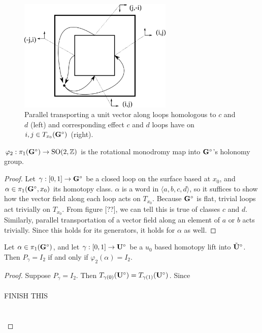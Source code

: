 \documentclass[a4paper, 11pt]{article}
\def\btUs{\btU^\circ}
\def\<{\langle} \def\>{\rangle}
\begin{document}
\begin{figure}[H]
\centering

\includegraphics[width=2.9in]{monodromy.png}
\caption{Parallel transporting a unit vector along loops homologous to $c$ and $d$ (left) and corresponding effect $c$ and $d$ loops have on $i,j\in T_{x_0}(\mathbf{G}^\circ)$ (right).}
\label{fig:loop}
\end{figure}

\begin{thm}
$\varphi_2:\pi_1(\mathbf{G}^\circ)\rightarrow \mathrm{SO}(2,\mathbb{Z})$ is the rotational monodromy map into $\mathbf{G}^\circ$'s holonomy group.
\begin{proof}
Let $\gamma:[0,1]\rightarrow\mathbf{G}^\circ$ be a closed loop on the surface based at $x_0$, and $\alpha\in\pi_1(\mathbf{G}^\circ,x_0)$ its homotopy class. $\alpha$ is a word in $\<a,b,c,d\>$, so it suffices to show how the vector field along each loop acts on $T_{x_0}$. Because $\mathbf{G}^\circ$ is flat, trivial loops act trivially on $T_{x_0}$. From figure [??], we can tell this is true of classes $c$ and $d$. Similarly, parallel transportation of a vector field along an element of $a$ or $b$ acts trivially. Since this holds for its generators, it holds for $\alpha$ as well.
\end{proof}
\end{thm}


\begin{lem}
Let $\alpha\in\pi_1(\mathbf{G}^\circ)$, and let $\gamma:[0,1]\rightarrow\mathbf{U}^\circ$ be a $u_0$ based homotopy lift into $\btUs$. Then $P_{\gamma}=I_2$ if and only if $\varphi_2(\alpha)=I_2$.
\begin{proof}
Suppose $P_{\gamma}=I_2$. Then $T_{\gamma(0)}(\mathbf{U}^\circ)=T_{\gamma(1)}(\mathbf{U}^\circ)$. Since \\\\
FINISH THIS\\\\\\
\end{proof}
\end{lem}
\end{document}
